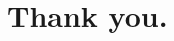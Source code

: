 \documentclass[12pt, aspectratio=169]{beamer}
\begin{document}









    \section*{Thank you.}
\end{document}
